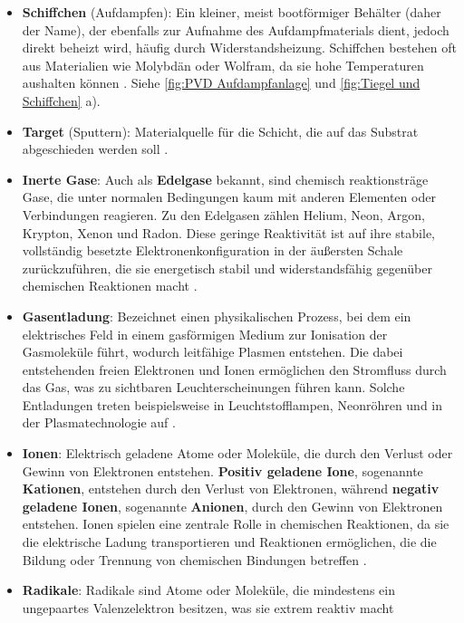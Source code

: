 \documentclass{article} %
\begin{document}
\begin{itemize}
    \item \textbf{Schiffchen} (Aufdampfen): Ein kleiner, meist bootförmiger Behälter (daher der Name), der 
    ebenfalls zur Aufnahme des Aufdampfmaterials dient, jedoch direkt beheizt wird, häufig durch Widerstandsheizung. Schiffchen bestehen oft aus 
    Materialien wie Molybdän oder Wolfram, da sie hohe Temperaturen aushalten können \cite{mattox2010handbook, ohring2002}. Siehe \autoref{fig:PVD 
    Aufdampfanlage} und \autoref{fig:Tiegel und Schiffchen} a).
    \item \textbf{Target} (Sputtern): Materialquelle für die Schicht, die auf das Substrat abgeschieden werden soll \cite{keplinger2024}.
    \item \textbf{Inerte Gase}: Auch als \textbf{Edelgase} bekannt, sind chemisch reaktionsträge Gase, die unter normalen Bedingungen kaum mit 
    anderen Elementen oder Verbindungen reagieren. Zu den Edelgasen zählen Helium, Neon, Argon, Krypton, Xenon und Radon. Diese geringe Reaktivität ist auf 
    ihre stabile, vollständig besetzte Elektronenkonfiguration in der äußersten Schale zurückzuführen, die sie energetisch stabil und widerstandsfähig gegenüber 
    chemischen Reaktionen macht \cite{atkins_physical_chemistry, zumdahl_chemistry, silberberg_chemistry}.
    \item \textbf{Gasentladung}: Bezeichnet einen physikalischen Prozess, bei dem ein elektrisches Feld in einem gasförmigen Medium zur 
    Ionisation der Gasmoleküle führt, wodurch leitfähige Plasmen entstehen. Die dabei entstehenden freien Elektronen und Ionen ermöglichen den Stromfluss durch 
    das Gas, was zu sichtbaren Leuchterscheinungen führen kann. Solche Entladungen treten beispielsweise in Leuchtstofflampen, Neonröhren und in der 
    Plasmatechnologie auf \cite{prechtl2005grundlagen, boehler1994, hutchings2018}.
    \item \textbf{Ionen}: Elektrisch geladene Atome oder Moleküle, die durch den Verlust oder Gewinn von Elektronen entstehen. \textbf{Positiv geladene Ione}, 
    sogenannte \textbf{Kationen}, entstehen durch den Verlust von Elektronen, während \textbf{negativ geladene Ionen}, sogenannte \textbf{Anionen}, durch den 
    Gewinn von Elektronen entstehen. Ionen spielen eine zentrale Rolle in chemischen Reaktionen, da sie die elektrische Ladung transportieren und Reaktionen 
    ermöglichen, die die Bildung oder Trennung von chemischen Bindungen betreffen \cite{petrucci_general_chemistry, chang_chemistry, brown_chemistry_textbook}.
    \item \textbf{Radikale}: Radikale sind Atome oder Moleküle, die mindestens ein ungepaartes Valenzelektron besitzen, was sie extrem reaktiv macht 

\end{itemize}
\end{document}
